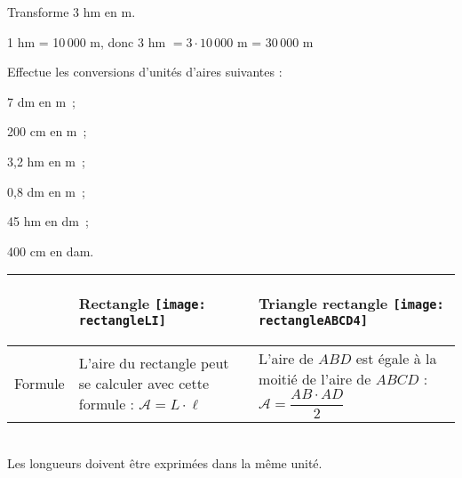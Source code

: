 \vspace{4em}

\begin{methode*1}

\begin{exemple*1}
Transforme 3 hm en m.

1 hm = 10\,000 m, donc 3 hm $= 3 \cdot 10\,000$ m = 30\,000 m
\end{exemple*1}

\exercice 
Effectue les conversions d'unités d'aires suivantes :
\begin{colenumerate}{3}
 \item 7 dm en m ;
 \item 200 cm en m ;
 \item 3,2 hm en m ;
 \item 0,8 dm en m ;
 \item 45 hm en dm ;
 \item 400 cm en dam.
 \end{colenumerate}

 \end{methode*1}





\newpage


\begin{aconnaitre}
\begin{tabularx}{\linewidth}{|c|X|X|}
 \cline{2-3}
\multicolumn{1}{c|}{} & \begin{center} \textbf{\textcolor{H1}{Rectangle}} \texttt{[image: rectangleLI]} \end{center} & \begin{center} \textbf{\textcolor{H1}{Triangle rectangle}} \texttt{[image: rectangleABCD4]} \end{center} \\ \hline
Formule & L'aire du rectangle peut se calculer avec cette formule : \textbf{\textcolor{H1}{$\mathcal{A} = L \cdot \ell$}} & L'aire de $ABD$ est égale à la moitié de l'aire de $ABCD$ : \textbf{\textcolor{H1}{$\mathcal{A} = \dfrac{AB \cdot AD}{2}$}} \\\hline
 \end{tabularx} \\[1em]
Les longueurs doivent être exprimées dans la même unité.
\end{aconnaitre}



